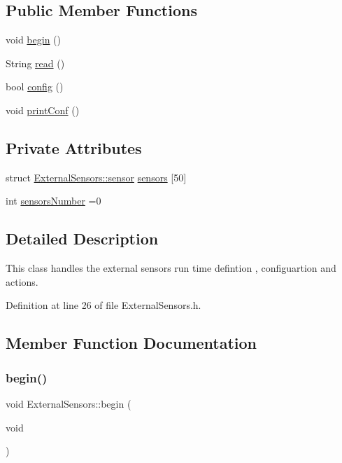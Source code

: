 \subsection*{Public Member Functions}
\begin{DoxyCompactItemize}
\item 
void \hyperlink{classExternalSensors_a58ede0d786a86417254708870f04a21e}{begin} ()
\item 
String \hyperlink{classExternalSensors_a53177b81eca3be89508b5511ddcd00fc}{read} ()
\item 
bool \hyperlink{classExternalSensors_a862a4bd11346b37270d0244c2adabe5a}{config} ()
\item 
void \hyperlink{classExternalSensors_a78c2bf55084435dd51d3c559b2d3c6f3}{print\+Conf} ()
\end{DoxyCompactItemize}
\subsection*{Private Attributes}
\begin{DoxyCompactItemize}
\item 
struct \hyperlink{structExternalSensors_1_1sensor}{External\+Sensors\+::sensor} \hyperlink{classExternalSensors_a284233f884fcf00154a44740cf1d9e1e}{sensors} \mbox{[}50\mbox{]}
\item 
int \hyperlink{classExternalSensors_a58e4fbf9adeae787d92be5fa33043b5d}{sensors\+Number} =0
\end{DoxyCompactItemize}


\subsection{Detailed Description}
This class handles the external sensors run time defintion , configuartion and actions. 

Definition at line 26 of file External\+Sensors.\+h.



\subsection{Member Function Documentation}
\mbox{\label{classExternalSensors_a58ede0d786a86417254708870f04a21e}} 
\subsubsection{\texorpdfstring{begin()}{begin()}}
{\footnotesize\ttfamily void External\+Sensors\+::begin (\begin{DoxyParamCaption}\item[{void}]{ }\end{DoxyParamCaption})}

